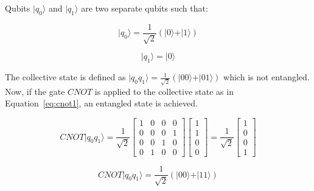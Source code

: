 Qubits $\vert q_0 \rangle$ and $\vert q_1 \rangle$ are two separate qubits such 
that:

\begin{linenomath}
\begin{equation}
\vert q_0 \rangle = \frac{1}{\sqrt{2}} (\vert 0 \rangle + \vert 1 \rangle)
\label{eq:q0}
\end{equation}
\end{linenomath}

\begin{linenomath}
\begin{equation}
\vert q_1 \rangle = \vert 0 \rangle
\label{eq:q1}
\end{equation}
\end{linenomath}

The collective state is defined as $\vert q_0q_1 \rangle = \frac{1}{\sqrt{2}} 
(\vert 00 \rangle + \vert 01 \rangle)$ which is not entangled. Now, if the gate
$CNOT$ is applied to the collective state as in Equation~\ref{eq:cnot1}, an
entangled state is achieved.

\begin{linenomath}
\begin{equation}
CNOT\vert q_0q_1 \rangle = \frac{1}{\sqrt{2}} \begin{bmatrix} 1 & 0 & 0 & 0 \\ 0 & 0 & 0 & 1 \\ 0 & 0 & 1 & 0 \\ 0 & 1 & 0 & 0 \end{bmatrix} \begin{bmatrix} 1\\1\\0\\0 \end{bmatrix} = \frac{1}{\sqrt{2}} \begin{bmatrix} 1\\0\\0\\1 \end{bmatrix} 
\label{eq:cnot1}
\end{equation}
\end{linenomath}

\begin{linenomath}
\begin{equation}
CNOT\vert q_0q_1 \rangle = \frac{1}{\sqrt{2}} (\vert 00 \rangle + \vert 11 \rangle)
\label{eq:cnot2}
\end{equation}
\end{linenomath}

